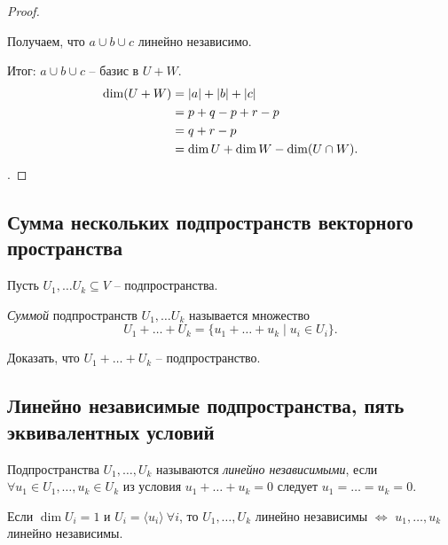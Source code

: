\begin{proof}
\begin{enumerate}
        Получаем, что $a \cup b \cup c$ линейно независимо.
    \end{enumerate}

    Итог: $a \cup b \cup c$ -- базис в $U + W$.
    \begin{align*}
        \dim (U + W) 
        &= |a| + |b| + |c| \\
        &= p + q - p + r - p \\
        &= q + r - p \\
        &= \dim U + \dim W - \dim (U \cap W)
    .\qedhere\end{align*}.
\end{proof}


\subsection{Сумма нескольких подпространств векторного пространства}

Пусть $U_1, \dots U_k \subseteq V$ -- подпространства.

\begin{definition}
    \textit{Суммой} подпространств $U_1, \dots U_k$ называется множество
    \begin{equation*}
        U_1 + \dots + U_k = \{u_1 + \dots + u_k \mid u_i \in U_i\}
    .\end{equation*}
\end{definition}

\begin{exercise}
    Доказать, что $U_1 + \dots + U_k$ -- подпространство.
\end{exercise}

\begin{comment}
    $\dim (U_1 + \dots + U_k) \leq \dim U_1 + \dots + \dim U_k$.
\end{comment}


\subsection{Линейно независимые подпространства, пять эквивалентных условий}

\begin{definition}
    Подпространства $U_1, \dots, U_k$ называются \textit{линейно независимыми}, если $\forall u_1 \in U_1, \dots, u_k \in U_k$ из условия $u_1 + \dots + u_k = 0$ следует $u_1 = \dots = u_k = 0$.
\end{definition}

\begin{example}
    Если $\dim U_i = 1$ и $U_i = \langle u_i \rangle \ \forall i$, то $U_1, \dots, U_k$ линейно независимы $\iff$ $u_1, \dots, u_k$ линейно независимы.
\end{example}

